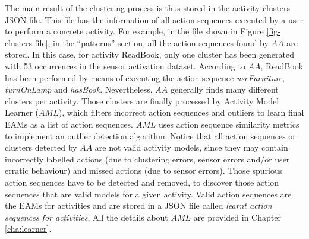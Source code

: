 The main result of the clustering process is thus stored in the activity clusters JSON file. This file has the information of all action sequences executed by a user to perform a concrete activity. For example, in the file shown in Figure \ref{fig-clusters-file}, in the ``patterns'' section, all the action sequences found by $AA$ are stored. In this case, for activity ReadBook, only one cluster has been generated with 53 occurrences in the sensor activation dataset. According to $AA$, ReadBook has been performed by means of executing the action sequence \textit{useFurniture}, \textit{turnOnLamp} and \textit{hasBook}. Nevertheless, $AA$ generally finds many different clusters per activity. Those clusters are finally processed by Activity Model Learner ($AML$), which filters incorrect action sequences and outliers to learn final EAMs as a list of action sequences. $AML$ uses action sequence similarity metrics to implement an outlier detection algorithm. Notice that all action sequences or clusters detected by $AA$ are not valid activity models, since they may contain incorrectly labelled actions (due to clustering errors, sensor errors and/or user erratic behaviour) and missed actions (due to sensor errors). Those spurious action sequences have to be detected and removed, to discover those action sequences that are valid models for a given activity. Valid action sequences are the EAMs for activities and are stored in a JSON file called \textit{learnt action sequences for activities}. All the details about $AML$ are provided in Chapter \ref{cha:learner}.